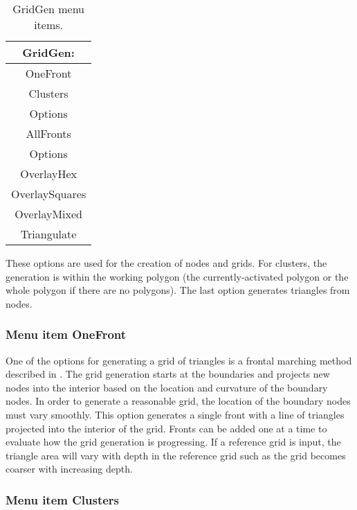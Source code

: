 \documentclass{article}
\begin{document}
\begin{table}[htb!]
 \caption{GridGen menu items.}
  \begin{center}
   \begin{tabular}{|c|}
    \hline
GridGen:\\     \hline
OneFront \\     \hline
Clusters \\ Options \\     \hline
AllFronts \\ Options \\     \hline
OverlayHex \\ OverlaySquares \\ OverlayMixed \\     \hline
Triangulate \\
    \hline
   \end{tabular}
   \label{tab:GRIDGEN}
  \end{center}
\end{table}


These options are used for the creation of nodes and grids. For clusters, the generation is within the working polygon (the currently-activated polygon or the whole polygon if there are no polygons). The last option generates triangles from nodes. 

\subsubsection[Menu item OneFront]{Menu item OneFront}
One of the options for generating a grid of triangles is a frontal marching method described in \cite{LO1998,S1980}. The grid generation starts at the boundaries and projects new nodes into the interior based on the location and curvature of the boundary nodes. In order to generate a reasonable grid, the location of the boundary nodes must vary smoothly. This option generates a single front with a line of triangles projected into the interior of the grid. Fronts can be added one at a time to evaluate how the grid generation is progressing. If a reference grid is input, the triangle area will vary with depth in the reference grid such as the grid becomes coarser with increasing depth.  

\subsubsection[Menu item Clusters]{Menu item Clusters}
\end{document}
